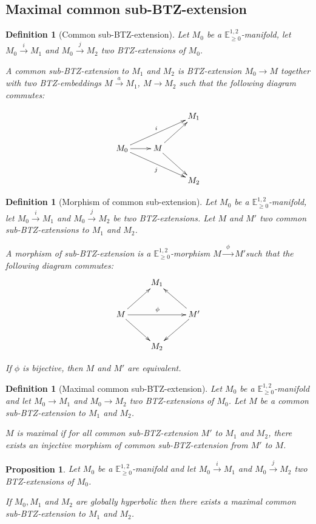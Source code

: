 \documentclass[a4paper,12pt]{article}
\newcommand{\mass}[1]{{\mathbb E}^{1,2}_{#1}}
\newtheorem{propou}[lemou]{Proposition}
\newtheorem{defou}[lemou]{Definition}    %
\begin{document}
		
		\subsection{Maximal common sub-BTZ-extension}
		\begin{defou}[Common sub-BTZ-extension] Let $M_0$ be a $\mass{\geq0}$-mani\-fold, let $M_0\xrightarrow{i} M_1$ and  $M_0 \xrightarrow{j} M_2$
			two BTZ-extensions of $M_0$.
			
			A common sub-BTZ-extension to $M_1$ and $M_2$ is BTZ-extension  $M_0\rightarrow M$  together with two BTZ-embeddings $M\xrightarrow{a} M_1$, $M \rightarrow M_2$ such that the following diagram commutes:
			
			$$
				\xymatrix{
					& &M_1\\
					M_0\ar[urr]^i \ar[drr]_j\ar[r]&M\ar[ur]\ar[dr]& \\
					&& M_2
				}		
			$$
		
		\end{defou}
		
		\begin{defou}[Morphism of common sub-extension]
			Let $M_0$ be a $\mass{\geq0}$-manifold, let $M_0\xrightarrow{i} M_1$ and $M_0 \xrightarrow{j} M_2$
			be two BTZ-extensions. Let $M$ and $M'$ two common sub-BTZ-extensions to $M_1$ and $M_2$.
			
			A morphism of sub-BTZ-extension is a $\mass{\geq0}$-morphism $M\xrightarrow{~~\phi~~} M'$such that the following diagram commutes:
			$$
				\xymatrix{
					 &M_1 &\\
					M\ar[ur]\ar[dr]\ar[rr]^\phi& &M'\ar[ul]\ar[dl]\\
					& M_2 &
				}		
			$$
			
			If $\phi$ is bijective, then $M$ and $M'$ are equivalent. 	
		\end{defou}
		\begin{defou}[Maximal common sub-BTZ-extension]
				Let $M_0$ be a $\mass{\geq0}$-manifold and let $M_0\xrightarrow{} M_1$ and $M_0 \xrightarrow{} M_2$
			two BTZ-extensions  of $M_0$. Let $M$ be a common sub-BTZ-extension to $M_1$ and $M_2$.
			
			$M$ is maximal if for all common sub-BTZ-extension $M'$ to $M_1$ and $M_2$,  there exists an injective morphism of common sub-BTZ-extension from $M'$ to $M$.
		\end{defou}



		\begin{propou}\label{prop:pgcd} Let $M_0$ be a $\mass{\geq0}$-manifold and let $M_0\xrightarrow{i} M_1$ and $M_0 \xrightarrow{j} M_2$
			two BTZ-extensions  of $M_0$. 

			If $M_0,M_1$ and $M_2$ are globally hyperbolic then there exists a maximal common sub-BTZ-extension to
			$M_1$ and $M_2$.
		\end{propou}
		
\end{document}
